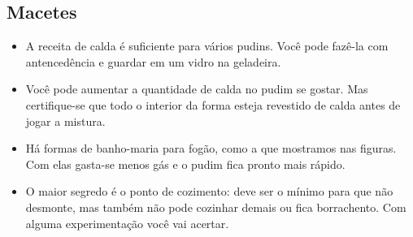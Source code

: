 \subsection{Macetes}
\begin{itemize}
\item A receita de calda é suficiente para vários pudins. Você pode fazê-la com antencedência e guardar em um vidro na geladeira.
\item Você pode aumentar a quantidade de calda no pudim se gostar. Mas certifique-se que todo o interior da forma esteja revestido de calda antes de jogar a mistura.
\item Há formas de banho-maria para fogão, como a que mostramos nas figuras. Com elas gasta-se menos gás e o pudim fica pronto mais rápido. 
\item O maior segredo é o ponto de cozimento: deve ser o mínimo para que não desmonte, mas também não pode cozinhar demais ou fica borrachento. Com alguma experimentação você vai acertar.
\end{itemize}
\pagebreak